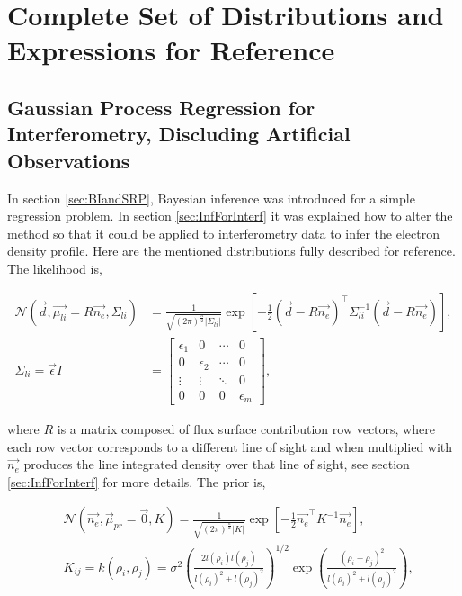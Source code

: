 \chapter{Complete Set of Distributions and Expressions for Reference}
\label{append:distexpres}
\section{Gaussian Process Regression for Interferometry, Discluding Artificial Observations}

In section \ref{sec:BIandSRP}, Bayesian inference was introduced for a simple regression problem. In section \ref{sec:InfForInterf} it was explained how to alter the method so that it could be applied to interferometry data to infer the electron density profile. Here are the mentioned distributions fully described for reference. The likelihood is,

\begin{equation}
\begin{aligned}
\mathcal{N}(\vec{d}, \vec{\mu_{li}} = R\vec{n_e}, \Sigma_{li}) &= \frac{1}{\sqrt{(2\pi)^{\frac{n}{2}}|\Sigma_{li}|}} \exp \left[{{-\frac{1}{2}(\vec{d}-R\vec{n_e})^\top\Sigma_{li}^{-1}(\vec{d}-R\vec{n_e})}}\right],\\
\Sigma_{li} = \vec{\epsilon}I &=
\begin{bmatrix}
\epsilon_1 & 0 & \cdots & 0\\
0 & \epsilon_2 & \cdots & 0\\
\vdots & \vdots & \ddots & 0 \\
0 & 0 & 0 &\epsilon_m
\end{bmatrix},
\end{aligned}
\end{equation}
  
\noindent where $R$ is a matrix composed of flux surface contribution row vectors, where each row vector corresponds to a different line of sight and when multiplied with $\vec{n_e}$ produces the line integrated density over that line of sight, see section \ref{sec:InfForInterf} for more details. The prior is,

\begin{equation}
\begin{aligned}
&\mathcal{N}(\vec{n_e}, \vec \mu_{pr} = \vec{0}, K) = \frac{1}{\sqrt{(2\pi)^{\frac{n}{2}}|K|}} \exp \left[{{-\frac{1}{2}\vec{n_e}^\top K^{-1}\vec{n_e}}}\right],\\
&K_{ij} = k(\rho_i, \rho_j) = \sigma^2 \left( \frac{2l(\rho_i)l(\rho_j)}{l(\rho_i)^2 + l(\rho_j)^2} \right)^{1/2} \exp\left({\frac{(\rho_i - \rho_j)^2}{l(\rho_i)^2+l(\rho_j)^2}}\right),\\
\end{aligned}
\end{equation}

